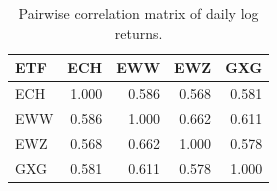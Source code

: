 \begin{table}[!htbp]
\centering
\caption{Pairwise correlation matrix of daily log returns.}
\label{tab:return-correlations}
\begin{tabular}{lrrrr}
\toprule
ETF & ECH & EWW & EWZ & GXG \\
\midrule
ECH & 1.000 & 0.586 & 0.568 & 0.581 \\
EWW & 0.586 & 1.000 & 0.662 & 0.611 \\
EWZ & 0.568 & 0.662 & 1.000 & 0.578 \\
GXG & 0.581 & 0.611 & 0.578 & 1.000 \\
\bottomrule
\end{tabular}
\end{table}
